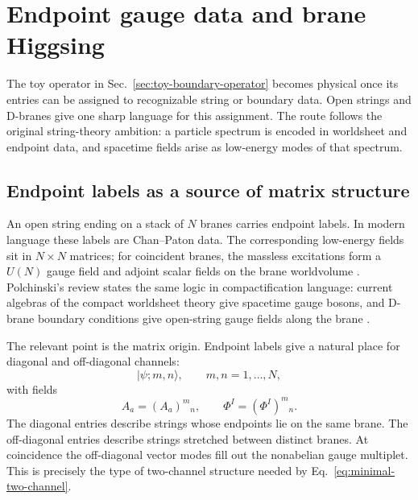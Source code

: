 \section{Endpoint gauge data and brane Higgsing}
\label{sec:endpoint-higgsing}

The toy operator in Sec.~\ref{sec:toy-boundary-operator} becomes physical once its entries can be assigned to recognizable string or boundary data.  Open strings and D-branes give one sharp language for this assignment.  The route follows the original string-theory ambition: a particle spectrum is encoded in worldsheet and endpoint data, and spacetime fields arise as low-energy modes of that spectrum.

\subsection{Endpoint labels as a source of matrix structure}
\label{sec:endpoint-labels}

An open string ending on a stack of \(N\) branes carries endpoint labels.  In modern language these labels are Chan--Paton data.  The corresponding low-energy fields sit in \(N\times N\) matrices; for coincident branes, the massless excitations form a \(U(N)\) gauge field and adjoint scalar fields on the brane worldvolume \cite{TongString}.  Polchinski's review states the same logic in compactification language: current algebras of the compact worldsheet theory give spacetime gauge bosons, and D-brane boundary conditions give open-string gauge fields along the brane \cite{Polchinski1994}.

The relevant point is the matrix origin.  Endpoint labels give a natural place for diagonal and off-diagonal channels:
\begin{equation}
  |\psi;m,n\rangle,
  \qquad
  m,n=1,\ldots,N,
  \label{eq:endpoint-labeled-state}
\end{equation}
with fields
\begin{equation}
  A_a=(A_a)^m{}_n,
  \qquad
  \Phi^I=(\Phi^I)^m{}_n .
  \label{eq:endpoint-matrix-fields}
\end{equation}
The diagonal entries describe strings whose endpoints lie on the same brane.  The off-diagonal entries describe strings stretched between distinct branes.  At coincidence the off-diagonal vector modes fill out the nonabelian gauge multiplet.  This is precisely the type of two-channel structure needed by Eq.~\eqref{eq:minimal-two-channel}.

